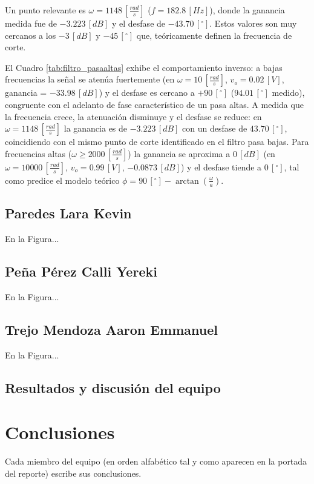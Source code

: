 \documentclass{article}
\newcommand{\EstudianteD}{Paredes Lara Kevin}
\newcommand{\EstudianteE}{Peña Pérez Calli Yereki}
\newcommand{\EstudianteF}{Trejo Mendoza Aaron Emmanuel}
\begin{document}
Un punto relevante es $\omega=1148\,[\frac{rad}{s}]$ ($f = 182.8\,[Hz]$), donde la ganancia medida fue de $-3.223\,[dB]$ y el desfase de $-43.70\,[^\circ]$. Estos valores son muy cercanos a los $-3\,[dB]$ y $-45\,[^\circ]$ que, teóricamente definen la frecuencia de corte. 

El Cuadro \ref{tab:filtro_pasaaltas} exhibe el comportamiento inverso: a bajas frecuencias la señal se atenúa fuertemente (en $\omega = 10\,[\frac{rad}{s}]$, $v_o = 0.02\,[V]$, ganancia = $-33.98\,[dB]$) y el desfase es cercano a $+90\,[^\circ]$ ($94.01\,[^\circ]$ medido), congruente con el adelanto de fase característico de un pasa altas. A medida que la frecuencia crece, la atenuación disminuye y el desfase se reduce: en $\omega = 1148\,[\frac{rad}{s}]$ la ganancia es de $-3.223\,[dB]$ con un desfase de $43.70\,[^\circ]$, coincidiendo con el mismo punto de corte identificado en el filtro pasa bajas. Para frecuencias altas ($\omega \ge 2000\,[\frac{rad}{s}]$) la ganancia se aproxima a $0 \,[dB]$ (en $\omega = 10 000 \,[\frac{rad}{s}]$, $v_o = 0.99\,[V]$, $-0.0873\,[dB]$) y el desfase tiende a $0\,[^\circ]$, tal como predice el modelo teórico $\phi = 90\,[^\circ]-\arctan(\frac{\omega}{a})$.

\subsection{\EstudianteD}
En la Figura...

\subsection{\EstudianteE} %
En la Figura...

\subsection{\EstudianteF}
En la Figura...
 
 
 
\subsection{Resultados y discusión del equipo}




\section{Conclusiones}
Cada miembro del equipo (en orden alfabético tal y como aparecen en la portada del reporte) escribe sus conclusiones.
\end{document}
